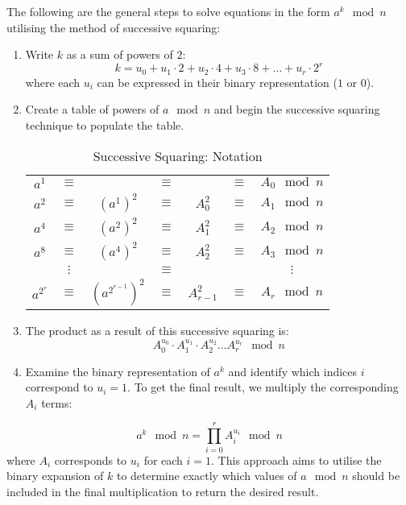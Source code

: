\documentclass{article}
\begin{document}
The following are the general steps to solve equations in the form $a^k \mod n$ utilising the method of successive squaring:
\begin{enumerate}
    \item Write $k$ as a sum of powers of $2$:
\begin{equation}
    k = u_0 + u_1 \cdot 2 + u_2 \cdot 4 + u_3 \cdot 8+ \ldots + u_r \cdot 2^r
\end{equation}
where each $u_i$ can be expressed in their binary representation ($1$ or $0$). 
\item Create a table of powers of $a \mod n$ and begin the successive squaring technique to populate the table.
\begin{table}
    \centering
    \begin{tabular}{ccccccc}
         $a^1$&  $\equiv$&  &  $\equiv$&  &  $\equiv$& $A_0 \mod n$\\
         $a^2$&  $\equiv$&  $(a^1)^2$&  $\equiv$&  $A^2_0$&  $\equiv$& $A_1 \mod n$\\
         $a^4$&  $\equiv$&  $(a^2)^2$&  $\equiv$&  $A^2_1$&  $\equiv$& $A_2 \mod n$\\
         $a^8$&  $\equiv$&  $(a^4)^2$&  $\equiv$&  $A^2_2$&  $\equiv$& $A_3 \mod n$\\
         &  $\vdots$&  &  $\equiv$&  &  & $\vdots$\\
         $a^{2^r}$&  $\equiv$&  $(a^{2^{r-1}})^2$&  $\equiv$&  $A^2_{r-1}$&  $\equiv$& $A_r \mod n$\\
    \end{tabular}
    \caption{Successive Squaring: Notation}
\end{table}
\item The product as a result of this successive squaring is:
\begin{equation}
 A^{u_0}_0 \cdot A^{u_1}_1 \cdot A^{u_2}_2 \ldots A^{u_r}_r  \mod n 
\end{equation}
\item Examine the binary representation of $a^k$ and identify which indices $i$ correspond to $u_i = 1$. To get the final result, we multiply the corresponding $A_i$ terms:
\end{enumerate}
\begin{equation}
    a^k \mod n = \prod_{i=0}^{r} A_i^{u_i} \mod n
\end{equation}
where $A_i$ corresponds to $u_i$ for each $i = 1$.  This approach aims to utilise the binary expansion of $k$ to determine exactly which values of $a \mod n$ should be included in the final multiplication to return the desired result. 
\end{document}
